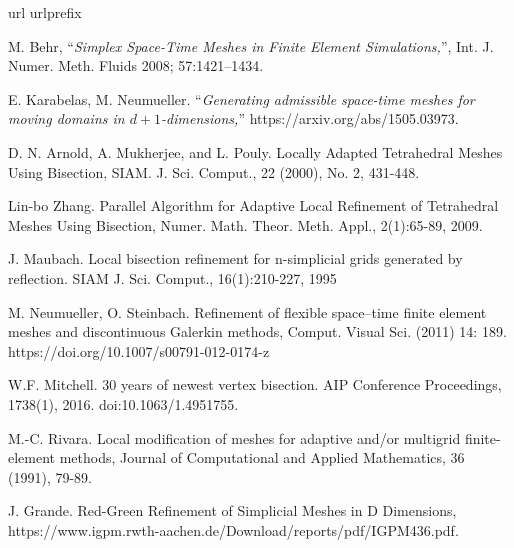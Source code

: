 \documentclass[a4paper,12pt]{amsart}
\numberwithin{equation}{section}
\begin{document}
\begin{thebibliography}{99}
\expandafter\ifx\csname url\endcsname\relax
  \def\url#1{\texttt{#1}}\fi
\expandafter\ifx\csname urlprefix\endcsname\relax\def\urlprefix{URL }\fi

M. Behr, ``{\em Simplex Space-Time Meshes in Finite Element Simulations,}'',
Int. J. Numer. Meth. Fluids 2008; 57:1421–1434.

E. Karabelas, M. Neumueller. 
``{\em Generating admissible space-time meshes for moving domains in $d + 1$-dimensions,}''
https://arxiv.org/abs/1505.03973.

D. N. Arnold, A. Mukherjee, and L. Pouly. Locally Adapted Tetrahedral Meshes Using Bisection, SIAM. J. Sci. Comput., 22 (2000), No. 2, 431-448.

Lin-bo Zhang. Parallel Algorithm for Adaptive Local Refinement
of Tetrahedral Meshes Using Bisection, Numer. Math. Theor. Meth. Appl., 2(1):65-89, 2009.

J. Maubach. Local bisection refinement for n-simplicial grids generated by reflection. SIAM J. Sci. Comput., 16(1):210-227, 1995

M. Neumueller, O. Steinbach. Refinement of flexible space–time finite element meshes and discontinuous Galerkin methods, Comput. Visual Sci. (2011) 14: 189. https://doi.org/10.1007/s00791-012-0174-z

W.F. Mitchell. 30 years of newest vertex bisection. AIP Conference Proceedings, 1738(1), 2016. doi:10.1063/1.4951755.

M.-C. Rivara. Local modification of meshes for adaptive and/or 
multigrid finite-element methods, Journal of Computational and  Applied Mathematics, 36 (1991), 79-89.


J. Grande. Red-Green Refinement of Simplicial Meshes in D Dimensions, https://www.igpm.rwth-aachen.de/Download/reports/pdf/IGPM436.pdf.

\end{thebibliography}
\end{document}

